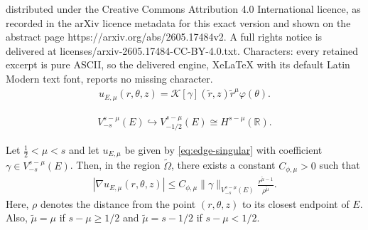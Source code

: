 \documentclass[10pt,a4paper]{amsart}
\renewcommand{\O}{\Omega}
\newcommand{\R}{\mathbb{R}}
\newcommand{\g}{\gamma}
\newcommand{\n}{\nabla}
\renewcommand{\t}{\theta}
\newcommand{\vf}{\varphi}
\begin{document}
distributed under the Creative Commons Attribution 4.0 International licence, as recorded in the arXiv licence metadata for this exact version and shown on the abstract page https://arxiv.org/abs/2605.17484v2. A full rights notice is delivered at licenses/arxiv-2605.17484-CC-BY-4.0.txt. Characters: every retained excerpt is pure ASCII, so the delivered engine, XeLaTeX with its default Latin Modern text font, reports no missing character.
        \begin{align}\label{eq:edge-singular}
            u_{E,\mu}(r,\t,z)= \mathcal{K}[\g](\widetilde{r},z)\widetilde{r}^\mu\vf(\t).
        \end{align}

        \begin{align}\label{eq:embedding-weighted}
                V_{-s}^{s-\mu}(E)\hookrightarrow V_{-1/2}^{s-\mu}(E) \cong H^{s-\mu}(\R).
        \end{align}

        \begin{lemma}\label{lemma:esti-grad-edge}
            Let $\frac{1}{2}<\mu<s$ and let $u_{E,\mu}$ be given by \eqref{eq:edge-singular} with coefficient $\g\in V_{-s}^{s-\mu}(E)$. Then, in the region $\widetilde{\O}$, there exists a constant $C_{\phi,\mu}>0$ such that
            \begin{align}\label{eq:esti-grad-edge}
                |\n u_{E,\mu}(r,\t,z)| \leq C_{\phi,\mu} \|\g\|_{V_{-s}^{s-\mu}(E)}\frac{r^{\widetilde{\mu}-1}}{\rho^{\widetilde{\mu}}}.
            \end{align}
            Here, $\rho$ denotes the distance from the point $(r,\t,z)$ to its closest endpoint of $E$. Also, $\widetilde{\mu}=\mu$ if $s-\mu\geq 1/2$ and $\widetilde{\mu}=s-1/2$ if $s-\mu<1/2$.
        \end{lemma}
\end{document}
